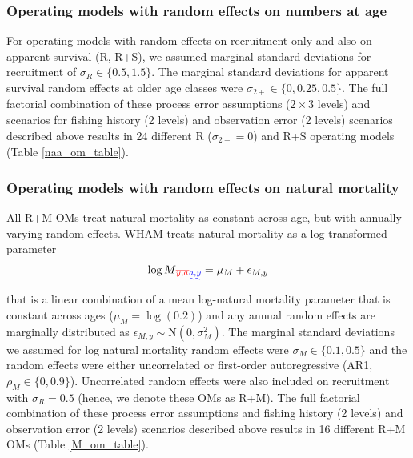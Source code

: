 \documentclass[
  12pt,
]{article}
\makeatletter
\providecommand{\DIFadd}[1]{{\protect\color{blue}\uwave{#1}}} %
\providecommand{\DIFdel}[1]{{\protect\color{red}\sout{#1}}} %
\providecommand{\DIFaddbegin}{} %
\providecommand{\DIFaddend}{} %
\providecommand{\DIFdelbegin}{} %
\providecommand{\DIFdelend}{} %
\providecommand{\DIFscaledelfig}{0.5}
\newlength{\DIFdelgraphicswidth} %
\newlength{\DIFdelgraphicsheight} %
\providecommand{\DIFaddincludegraphics}[2][]{{\color{blue}\fbox{\DIFOincludegraphics[#1]{#2}}}} %
\providecommand{\DIFdelincludegraphics}[2][]{%
\sbox{\DIFdelgraphicsbox}{\DIFOincludegraphics[#1]{#2}}%
\settoboxwidth{\DIFdelgraphicswidth}{\DIFdelgraphicsbox} %
\settoboxtotalheight{\DIFdelgraphicsheight}{\DIFdelgraphicsbox} %
\scalebox{\DIFscaledelfig}{%
\parbox[b]{\DIFdelgraphicswidth}{\usebox{\DIFdelgraphicsbox}\\[-\baselineskip] \rule{\DIFdelgraphicswidth}{0em}}\llap{\resizebox{\DIFdelgraphicswidth}{\DIFdelgraphicsheight}{%
\setlength{\unitlength}{\DIFdelgraphicswidth}%
\begin{picture}(1,1)%
\thicklines\linethickness{2pt} %
{\color[rgb]{1,0,0}\put(0,0){\framebox(1,1){}}}%
{\color[rgb]{1,0,0}\put(0,0){\line( 1,1){1}}}%
{\color[rgb]{1,0,0}\put(0,1){\line(1,-1){1}}}%
\end{picture}%
}\hspace*{3pt}}} %
} %
\DeclareRobustCommand{\DIFaddbegin}{\DIFOaddbegin \let\includegraphics\DIFaddincludegraphics} %
\DeclareRobustCommand{\DIFaddend}{\DIFOaddend \let\includegraphics\DIFOincludegraphics} %
\DeclareRobustCommand{\DIFdelbegin}{\DIFOdelbegin \let\includegraphics\DIFdelincludegraphics} %
\DeclareRobustCommand{\DIFdelend}{\DIFOaddend \let\includegraphics\DIFOincludegraphics} %
\let\sout@orig\sout %
\renewcommand{\sout}[1]{\ifmmode\text{\sout@orig{\ensuremath{#1}}}\else\sout@orig{#1}\fi} %
\makeatother
\begin{document}
\subsubsection*{Operating models with random effects on numbers at
age}\label{operating-models-with-random-effects-on-numbers-at-age}

For operating models with random effects on recruitment only and also on
apparent survival (R, R+S), we assumed marginal standard deviations for
recruitment of \(\sigma_R \in \{0.5,1.5\}\). The marginal standard
deviations for apparent survival random effects at older age classes
were \(\sigma_{2+} \in \{0,0.25, 0.5\}\). The full factorial combination
of these process error assumptions (\(2\times 3\) levels) and scenarios
for fishing history (2 levels) and observation error (2 levels)
scenarios described above results in 24 different R
(\(\sigma_{2+} = 0\)) and R+S operating models (Table
\ref{naa_om_table}).

\subsubsection*{Operating models with random effects on natural
mortality}\label{operating-models-with-random-effects-on-natural-mortality}

All R+M OMs treat natural mortality as constant across age, but with
annually varying random effects. WHAM treats natural mortality as a
log-transformed parameter \[
\log M\DIFdelbegin \DIFdel{_{y,a} }\DIFdelend \DIFaddbegin \DIFadd{_{a,y} }\DIFaddend = \mu_{M} + \epsilon_{M,y}
\] that is a linear combination of a mean log-natural mortality
parameter that is constant across ages (\(\mu_{M} = \log(0.2)\)) and any
annual random effects are marginally distributed as
\(\epsilon_{M,y} \sim \text{N}\left(0,\sigma_M^2\right)\). The marginal
standard deviations we assumed for log natural mortality random effects
were \(\sigma_M \in \{0.1, 0.5\}\) and the random effects were either
uncorrelated or first-order autoregressive (AR1,
\(\rho_M \in \{0,0.9\}\)). Uncorrelated random effects were also
included on recruitment with \(\sigma_R = 0.5\) (hence, we denote these
OMs as R+M). The full factorial combination of these process error
assumptions and fishing history (2 levels) and observation error (2
levels) scenarios described above results in 16 different R+M OMs (Table
\ref{M_om_table}).
\end{document}
